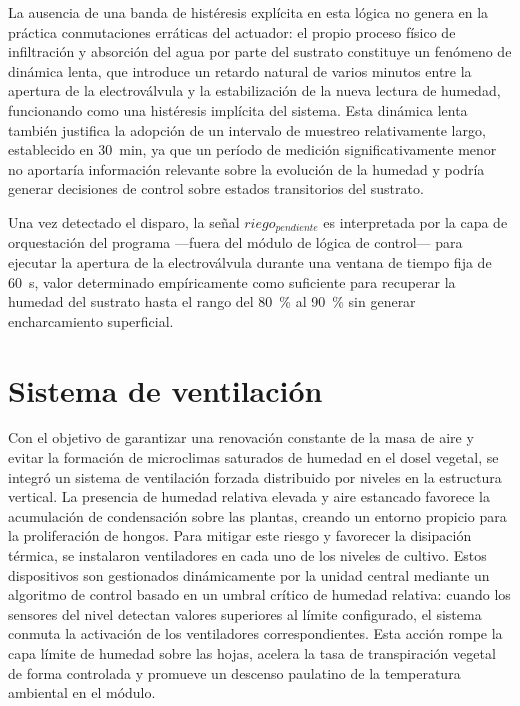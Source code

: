La ausencia de una banda de histéresis explícita en esta lógica no genera en la práctica conmutaciones erráticas del actuador: el propio proceso físico de infiltración y absorción del agua por parte del sustrato constituye un fenómeno de dinámica lenta, que introduce un retardo natural de varios minutos entre la apertura de la electroválvula y la estabilización de la nueva lectura de humedad, funcionando como una histéresis implícita del sistema. Esta dinámica lenta también justifica la adopción de un intervalo de muestreo relativamente largo, establecido en \SI{30}{\minute}, ya que un período de medición significativamente menor no aportaría información relevante sobre la evolución de la humedad y podría generar decisiones de control sobre estados transitorios del sustrato.

Una vez detectado el disparo, la señal $riego_{pendiente}$ es interpretada por la capa de orquestación del programa ---fuera del módulo de lógica de control--- para ejecutar la apertura de la electroválvula durante una ventana de tiempo fija de \SI{60}{\second}, valor determinado empíricamente como suficiente para recuperar la humedad del sustrato hasta el rango del \SI{80}{\percent} al \SI{90}{\percent} sin generar encharcamiento superficial.


\section{Sistema de ventilación}
\label{sec:sistema_ventilacion}

Con el objetivo de garantizar una renovación constante de la masa de aire y evitar la formación de microclimas saturados de humedad en el dosel vegetal, se integró un sistema de ventilación forzada distribuido por niveles en la estructura vertical. La presencia de humedad relativa elevada y aire estancado favorece la acumulación de condensación sobre las plantas, creando un entorno propicio para la proliferación de hongos. Para mitigar este riesgo y favorecer la disipación térmica, se instalaron ventiladores en cada uno de los niveles de cultivo. Estos dispositivos son gestionados dinámicamente por la unidad central mediante un algoritmo de control basado en un umbral crítico de humedad relativa: cuando los sensores del nivel detectan valores superiores al límite configurado, el sistema conmuta la activación de los ventiladores correspondientes. Esta acción rompe la capa límite de humedad sobre las hojas, acelera la tasa de transpiración vegetal de forma controlada y promueve un descenso paulatino de la temperatura ambiental en el módulo.

